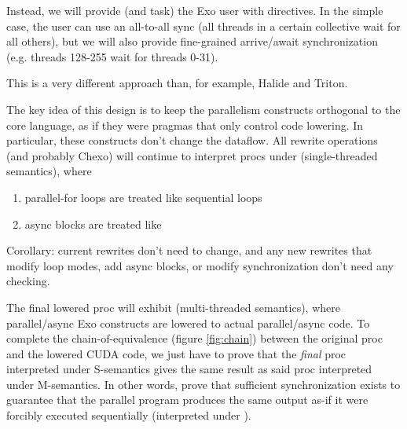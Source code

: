 Instead, we will provide (and task) the Exo user with  directives.
In the simple case, the user can use an all-to-all sync (all threads in a certain collective wait for all others),
but we will also provide fine-grained arrive/await synchronization (e.g. threads 128-255 wait for threads 0-31).

This is a very different approach than, for example, Halide and Triton.

\filbreak
{}

The key idea of this design is to keep the parallelism constructs orthogonal to the core language, as if they were pragmas that only control code lowering.
In particular, these constructs don't change the dataflow.
All rewrite operations (and probably Chexo) will continue to interpret procs under  (single-threaded semantics), where
\begin{enumerate}
  \item parallel-for loops are treated like sequential loops
  \item async blocks are treated like 
\end{enumerate}

\filbreak
Corollary: current rewrites don't need to change, and any new rewrites that modify loop modes, add async blocks, or modify synchronization don't need any checking.

\filbreak
The final lowered proc will exhibit  (multi-threaded semantics), where parallel/async Exo constructs are lowered to actual parallel/async code.
To complete the chain-of-equivalence (figure \ref{fig:chain}) between the original proc and the lowered CUDA code, we just have to prove that the \textit{final} proc interpreted under S-semantics gives the same result as said proc interpreted under M-semantics.
In other words, prove that sufficient synchronization exists to guarantee that the parallel program produces the same 
output as-if it were forcibly executed sequentially (interpreted under ).


